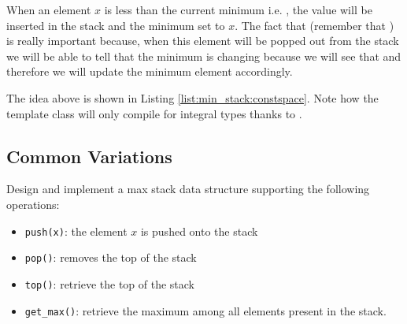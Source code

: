 When an element $x$ is less than the current minimum i.e. , the value  will be inserted in the stack and the minimum set to $x$. The fact that  (remember that ) is really important because, when this element will be popped out from the stack we will be able to tell that the minimum is changing because we will see that  and therefore we will update the minimum element accordingly.

The idea above is shown in Listing \ref{list:min_stack:constspace}. Note how the template class will only compile for integral types thanks to \cite{cit::std::enableif}. 

 

\subsection{Common Variations}
\begin{exercise}
	 Design and implement a max stack data structure supporting the following operations:
	\begin{itemize}
		\item \lstinline[columns=fixed]{push(x)}: the element $x$ is pushed onto the stack
		\item \lstinline[columns=fixed]{pop()}: removes the top of the stack
		\item \lstinline[columns=fixed]{top()}: retrieve the top of the stack
		\item \lstinline[columns=fixed]{get_max()}: retrieve the maximum among all elements present in the stack.
	\end{itemize}

\end{exercise}